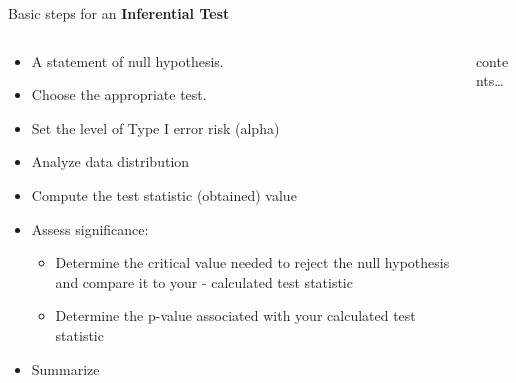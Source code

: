 \documentclass[
  ignorenonframetext,
]{beamer}
\providecommand{\tightlist}{%
  \setlength{\itemsep}{0pt}\setlength{\parskip}{0pt}}
\begin{document}
\begin{frame}{Basic steps for an \textbf{Inferential Test}}
\label{basic-steps-for-an-inferential-test}
\begin{columns}[T]
\begin{column}{0.7\textwidth}
\begin{itemize}
\tightlist
\item
  A statement of null hypothesis.
\end{itemize}

\begin{itemize}
\tightlist
\item
  Choose the appropriate test.
\end{itemize}

\begin{itemize}
\tightlist
\item
  Set the level of Type I error risk (alpha)
\end{itemize}

\begin{itemize}
\tightlist
\item
  Analyze data distribution
\end{itemize}

\begin{itemize}
\item
  Compute the test statistic (obtained) value
\item
  Assess significance:

  \begin{itemize}
  \tightlist
  \item
    Determine the critical value needed to reject the null hypothesis
    and compare it to your - calculated test statistic
  \item
    Determine the p-value associated with your calculated test statistic
  \end{itemize}
\end{itemize}

\begin{itemize}
\tightlist
\item
  Summarize
\end{itemize}
\end{column}

\begin{column}{0.3\textwidth}
contents\ldots{}
\end{column}
\end{columns}
\end{frame}
\end{document}
